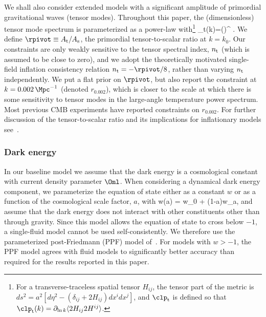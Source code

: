 We shall also consider  extended models with a significant amplitude of primordial
gravitational waves (tensor modes). Throughout this paper, the (dimensionless) tensor mode spectrum
is parameterized as a power-law with\footnote{For a transverse-traceless spatial tensor $H_{ij}$, the tensor
  part of the metric is $ds^2 = a^2[d\eta^2 - (\delta_{ij}+2H_{ij})
  dx^i dx^j]$, and $\clp_{\rm t}$ is defined so that $\clp_{\rm t}(k)
  = \partial_{\ln k} \langle 2 H_{ij} 2H^{ij}\rangle$.}
\be
 \clp_{\rm t}(k)=\At \left(\right)^{\nt} .
\ee
We define $\rpivot \equiv A_{\rm t}/A_{\rm s}$, the primordial tensor-to-scalar ratio at
$k=k_0$.
Our constraints are only weakly sensitive to the tensor spectral index,
$n_{\rm t}$ (which is assumed to be close to zero), and we adopt the theoretically motivated
single-field inflation consistency relation $n_{\rm t}=-\rpivot /8$,
rather than varying $n_{\rm t}$ independently.
We put a flat prior on $\rpivot$, but also report the constraint at
$k=0.002\,\Mpc^{-1}$ (denoted $r_{0.002}$),
which is closer to the scale at which there is some sensitivity to tensor modes in the large-angle temperature power spectrum. Most previous CMB experiments
have reported constraints on $r_{0.002}$.
For further discussion of the tensor-to-scalar ratio and its
implications for inflationary models see~\citet{planck2013-p17}.


\subsubsection{Dark energy}

In our baseline model we assume that the dark energy is a cosmological
constant with current density parameter $\Oml$. When considering a dynamical
dark energy component,  we parameterize the equation of state either as a constant $w$ or as a function of the cosmological scale factor, $a$, with
\be
  w(a) \equiv {} = w_0 + (1-a)w_a,  \label{DE0}
\ee
and assume that the dark energy does not interact with other constituents
other than through gravity. Since this model allows the equation of
state to cross below $-1$, a single-fluid model cannot be used
self-consistently.  We therefore use the parameterized post-Friedmann (PPF)
model of~\citet{Fang:2008sn}. For models with
$w>-1$, the PPF model agrees with fluid
models to significantly better accuracy than required for the
results reported in this paper.

